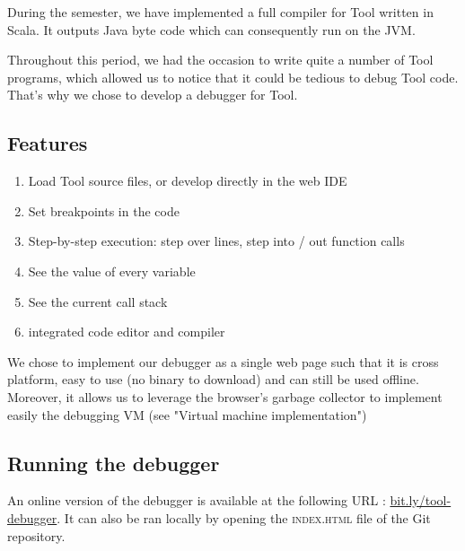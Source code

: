 During the semester, we have implemented a full compiler for Tool written in Scala. It outputs Java byte code which can consequently run on the JVM.

Throughout this period, we had the occasion to write quite a number of Tool programs, which allowed us to notice that it could be tedious to debug Tool code. That's why we chose to develop a debugger for Tool.

\subsection{Features}

\begin{enumerate}
\item Load Tool source files, or develop directly in the web IDE
\item Set breakpoints in the code
\item Step-by-step execution: step over lines, step into / out function calls
\item See the value of every variable
\item See the current call stack
\item integrated code editor and compiler
\end{enumerate}

We chose to implement our debugger as a single web page such that it is cross platform, easy to use (no binary to download) and can still be used offline. Moreover, it allows us to leverage the browser's garbage collector to implement easily the debugging VM (see "Virtual machine implementation")

\subsection{Running the debugger}

An online version of the debugger is available at the following URL : \href{http://bit.ly/tool-debugger}{bit.ly/tool-debugger}. It can also be ran locally by opening the \textsc{index.html} file of the Git repository.






